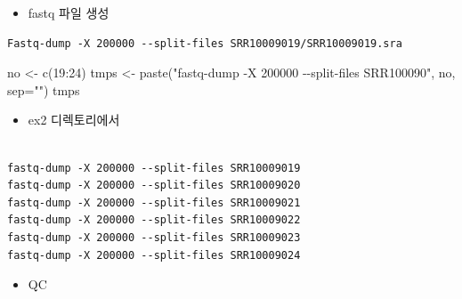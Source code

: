 \documentclass[
]{book}
\newenvironment{Shaded}{\begin{snugshade}}{\end{snugshade}}
\newcommand{\AttributeTok}[1]{\textcolor[rgb]{0.77,0.63,0.00}{#1}}
\newcommand{\DecValTok}[1]{\textcolor[rgb]{0.00,0.00,0.81}{#1}}
\newcommand{\FunctionTok}[1]{\textcolor[rgb]{0.00,0.00,0.00}{#1}}
\newcommand{\NormalTok}[1]{#1}
\newcommand{\OtherTok}[1]{\textcolor[rgb]{0.56,0.35,0.01}{#1}}
\newcommand{\SpecialCharTok}[1]{\textcolor[rgb]{0.00,0.00,0.00}{#1}}
\newcommand{\StringTok}[1]{\textcolor[rgb]{0.31,0.60,0.02}{#1}}
\providecommand{\tightlist}{%
  \setlength{\itemsep}{0pt}\setlength{\parskip}{0pt}}
\begin{document}
\begin{itemize}
\tightlist
\item
  fastq 파일 생성
\end{itemize}

\begin{verbatim}
Fastq-dump -X 200000 --split-files SRR10009019/SRR10009019.sra
\end{verbatim}

\begin{Shaded}
\begin{Highlighting}[]

\NormalTok{no }\OtherTok{\textless{}{-}} \FunctionTok{c}\NormalTok{(}\DecValTok{19}\SpecialCharTok{:}\DecValTok{24}\NormalTok{)}
\NormalTok{tmps }\OtherTok{\textless{}{-}} \FunctionTok{paste}\NormalTok{(}\StringTok{"fastq{-}dump {-}X 200000 {-}{-}split{-}files SRR100090"}\NormalTok{, no, }\AttributeTok{sep=}\StringTok{""}\NormalTok{)}
\NormalTok{tmps}
\end{Highlighting}
\end{Shaded}

\begin{itemize}
\tightlist
\item
  ex2 디렉토리에서
\end{itemize}

\begin{verbatim}

fastq-dump -X 200000 --split-files SRR10009019
fastq-dump -X 200000 --split-files SRR10009020
fastq-dump -X 200000 --split-files SRR10009021
fastq-dump -X 200000 --split-files SRR10009022
fastq-dump -X 200000 --split-files SRR10009023
fastq-dump -X 200000 --split-files SRR10009024
\end{verbatim}

\begin{itemize}
\tightlist
\item
  QC
\end{itemize}
\end{document}
